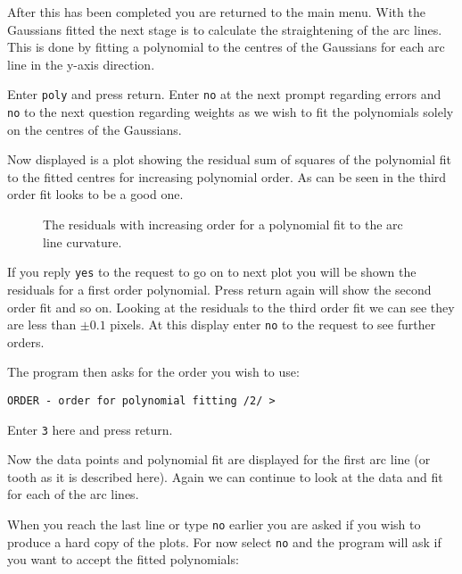 After this has been completed you are returned to the main menu. With the Gaussians fitted the next stage is to calculate the straightening of the arc lines. This is done by fitting a polynomial to the centres of the Gaussians for each arc line in the y-axis direction.

Enter {\tt poly} and press return. Enter {\tt no} at the next prompt regarding errors and {\tt no} to the next question regarding weights as we wish to fit the polynomials solely on the centres of the Gaussians.

Now displayed is a plot showing the residual sum of squares of the polynomial fit to the fitted centres for increasing polynomial order. As can be seen in  the third order fit looks to be a good one.

\begin{figure}
\begin{center}
{\leavevmode\epsfysize=136mm}

\parbox{140mm}{
\caption{The residuals with increasing order for a polynomial fit to the arc line curvature.}
\label{poly_order}
}
\end{center}
\end{figure}


If you reply {\tt yes} to the request to go on to next plot you will be shown the residuals for a first order polynomial. Press return again will show the second order fit and so on. Looking at the residuals to the third order fit we can see they are less than $\pm0.1$ pixels. At this display enter {\tt no} to the request to see further orders.

The program then asks for the order you wish to use:
{\scspec{\small}{ }
\begin{verbatim}
ORDER - order for polynomial fitting /2/ > 
\end{verbatim}
}

Enter {\tt 3} here and press return.

Now the data points and polynomial fit are displayed for the first arc line (or tooth as it is described here). Again we can continue to look at the data and fit for each of the arc lines.

When you reach the last line or type {\tt no} earlier you are asked if you wish to produce a hard copy of the plots. For now select {\tt no} and the program will ask if you want to accept the fitted polynomials:

